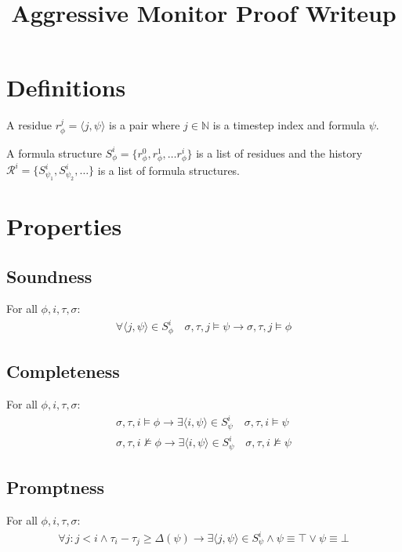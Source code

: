 \documentclass[10pt,a4paper]{article}
\title{Aggressive Monitor Proof Writeup}
\newcommand{\rp}[2]{\ensuremath{\langle #1, #2 \rangle}}
\newcommand{\res}[2]{\ensuremath{r_{#1}^{#2}}}
\begin{document}
\maketitle

\section{Definitions}
A residue $\res{\phi}{j} = \rp{j}{\psi}$ is a pair where $j \in \mathbb{N}$ is a timestep index and formula $\psi$.

A formula structure $S_{\phi}^i = \{ r_{\phi}^0, r_{\phi}^1, \ldots r_{\phi}^i \}$ is a list of residues and the history $\mathcal{R}^i = \{ S_{\psi_1}^i, S_{\psi_2}^i,\ldots \}$ is a list of formula structures.



\section{Properties}



\subsection{Soundness}
For all $\phi, i, \tau, \sigma$:
\begin{align}
\forall \langle j, \psi \rangle \in S_{\phi}^i \quad  \sigma , \tau , j \vDash \psi \rightarrow \sigma , \tau , j \vDash \phi
\end{align}
\subsection{Completeness}
For all $\phi, i, \tau, \sigma$:
\begin{align}
\sigma, \tau, i \vDash \phi \rightarrow \exists \langle i, \psi \rangle \in S_{\psi}^i \quad \sigma, \tau, i \vDash \psi \\
\sigma, \tau, i \nvDash \phi \rightarrow \exists \langle i, \psi \rangle \in S_{\psi}^i \quad \sigma, \tau, i \nvDash \psi
\end{align}
\subsection{Promptness}
For all $\phi, i, \tau, \sigma$:
\begin{align}
\forall j:  j<i \wedge \tau_i - \tau_j \geq \Delta (\psi) \rightarrow \exists \langle j, \psi \rangle \in S_{\psi}^i \wedge \psi \equiv \top \vee \psi \equiv \bot
\end{align}
\end{document}
